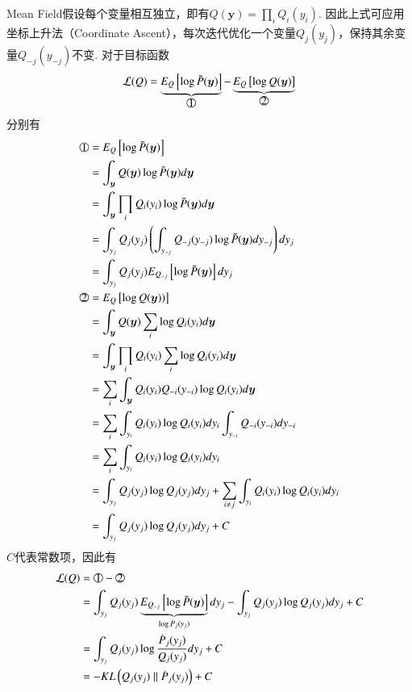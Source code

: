 Mean Field假设每个变量相互独立，即有$Q(\boldsymbol{y})=\prod_i{Q_i(y_i)}$.
因此上式可应用坐标上升法（Coordinate Ascent），每次迭代优化一个变量$Q_j(y_j)$，保持其余变量$Q_{-j}(y_{-j})$不变.
对于目标函数
\begin{equation}
	\mathcal{L}(Q)=\underbrace{E_{Q}\left[\log \tilde{P}(\boldsymbol{y})\right]}_{\tcircle{1}}-\underbrace{E_{Q}\left[\log Q(\boldsymbol{y})\right]}_{\tcircle{2}}
\end{equation}
分别有
\begin{equation}
	\begin{split}
		\tcircle{1}&=E_{Q}\left[\log \tilde{P}(\boldsymbol{y})\right]\\
		&=\int_{\boldsymbol{y}}Q(\boldsymbol{y}) \log \tilde{P}(\boldsymbol{y})d\boldsymbol{y}\\
		&=\int_{\boldsymbol{y}}\prod_i{Q_i(y_i)} \log \tilde{P}(\boldsymbol{y})d\boldsymbol{y}\\
		&=\int_{y_j}Q_j(y_j)\left(\int_{y_{-j}}Q_{-j}(y_{-j})\log \tilde{P}(\boldsymbol{y}) dy_{-j}\right) dy_j\\
		&=\int_{y_j}Q_j(y_j)E_{Q_{-j}}\left[\log \tilde{P}(\boldsymbol{y}) \right] dy_j\\
		\tcircle{2}&=E_{Q}\left[\log Q(\boldsymbol{y}))\right]\\
		&=\int_{\boldsymbol{y}}Q(\boldsymbol{y}) \sum_i\log Q_i(y_i) d\boldsymbol{y}\\
		&=\int_{\boldsymbol{y}}\prod_i{Q_i(y_i)} \sum_i\log Q_i(y_i) d\boldsymbol{y}\\
		&=\sum_i\int_{\boldsymbol{y}}Q_i(y_i)Q_{-i}(y_{-i})\log Q_i(y_i) d\boldsymbol{y}\\
		&=\sum_i\int_{y_i}Q_i(y_i)\log Q_i(y_i) dy_i\int_{y_{-i}} {Q_{-i}(y_{-i})}dy_{-i}\\
		&=\sum_i\int_{y_i}Q_i(y_i)\log Q_i(y_i) dy_i\\
		&=\int_{y_j}Q_j(y_j)\log Q_j(y_j) dy_j + \sum_{i\neq j}\int_{y_i}Q_i(y_i)\log Q_i(y_i) dy_i  \\
		&=\int_{y_j}Q_j(y_j)\log Q_j(y_j) dy_j + C
	\end{split}
\end{equation}
$C$代表常数项，因此有
\begin{equation}
	\begin{split}
		\mathcal{L}(Q)&=\tcircle{1}-\tcircle{2}\\
		&=\int_{y_j}Q_j(y_j)\underbrace{E_{Q_{-j}}\left[\log \tilde{P}(\boldsymbol{y}) \right]}_{\log \dot{P}_j(y_j)} dy_j-\int_{y_j}Q_j(y_j)\log Q_j(y_j) dy_j +C\\
		&=\int_{y_j}Q_j(y_j)\log\frac{\dot{P}_j(y_j)}{Q_j(y_j)} dy_j +C\\
		&=-KL\left(Q_j(y_j)\;\|\;\dot{P}_j(y_j)\right)+C
	\end{split}
\end{equation}
